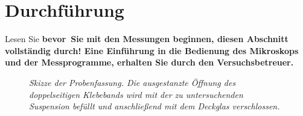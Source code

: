 \documentclass{../papanleitung}
\begin{document}
\section{Durchf\"{u}hrung}

Lesen Sie \bf bevor\rm~Sie mit den Messungen beginnen, diesen
Abschnitt vollst\"{a}ndig durch! Eine Einf\"{u}hrung in die Bedienung des
Mikroskops und der Messprogramme, erhalten Sie durch den
Versuchsbetreuer.

\begin{figure}[h]
\begin{minipage}[c]{12cm}
\centering{}
\caption{\label{249_probe}\fontsize{10}{12}\it Skizze der
Probenfassung. Die ausgestanzte \"{O}ffnung des doppelseitigen
Klebebands wird mit der zu untersuchenden Suspension bef\"{u}llt und
anschlie{\ss}end mit dem Deckglas verschlossen.}
\end{minipage}
\end{figure}
\end{document}
